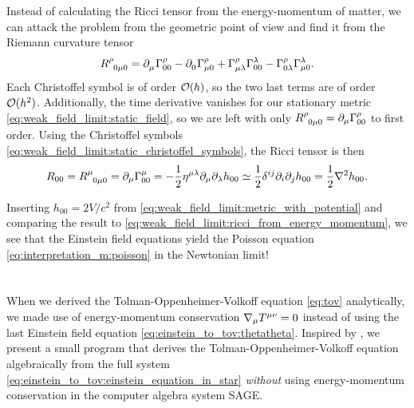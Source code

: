 Instead of calculating the Ricci tensor from the energy-momentum of matter, we can attack the problem from the geometric point of view and find it from the Riemann curvature tensor
\begin{equation}
	R\indices{^\rho_0_\mu_0} =
	\partial\indices{_\mu} \Gamma^\rho_{0 0} -
	\partial\indices{_0} \Gamma^{\rho}_{\mu 0} +
	\Gamma^\rho_{\mu \lambda} \Gamma^{\lambda}_{0 0} -
	\Gamma^\rho_{0 \lambda} \Gamma^{\lambda}_{\mu 0} .
\end{equation}
Each Christoffel symbol is of order $\mathcal{O}(h)$, so the two last terms are of order $\mathcal{O}(h^2)$.
Additionally, the time derivative vanishes for our stationary metric \eqref{eq:weak_field_limit:static_field}, so we are left with only $R\indices{^\rho_0_\mu_0} = \partial_\mu \Gamma^\rho_{00}$ to first order.
Using the Christoffel symbols \eqref{eq:weak_field_limit:static_christoffel_symbols}, the Ricci tensor is then
\begin{equation}
	R_{00} =       R\indices{^\mu_{0 \mu 0}}
		   = \partial_\mu \Gamma^\mu_{00}
		   = -\frac12 \eta^{\mu \lambda} \partial_\mu \partial_\lambda h_{00}
		   \taylor  \frac12 \delta^{i j} \partial_i \partial_j h_{00}
		   =        \frac12 \nabla^2 h_{00} .
	\label{eq:weak_field_limit:ricci_from_riemann}
\end{equation}

Inserting $h_{00} = 2V/c^2$ from \cref{eq:weak_field_limit:metric_with_potential} and comparing the result to \cref{eq:weak_field_limit:ricci_from_energy_momentum}, we see that the Einstein field equations yield the Poisson equation \eqref{eq:interpretation_m:poisson} in the Newtonian limit!

\section{\texorpdfstring%
{}%
{CAS derivation of the Tolman-Oppenheimer-Volkoff equation}} %
\label{sec:tov_cas_derivation}

When we derived the Tolman-Oppenheimer-Volkoff equation \eqref{eq:tov} analytically, we made use of energy-momentum conservation $\nabla_\mu T\indices{^\mu^\nu} = 0$ instead of using the last Einstein field equation \cref{eq:einstein_to_tov:thetatheta}.
Inspired by \cite{ref:sage_tov}, we present a small program that derives the Tolman-Oppenheimer-Volkoff equation algebraically from the full system \eqref{eq:einstein_to_tov:einstein_equation_in_star} \emph{without} using energy-momentum conservation in the computer algebra system SAGE.

